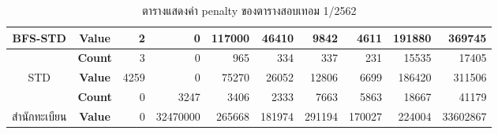 \begin{table}[]
{\begin{tabular}{@{}ccrrrrrrrr@{}}
    \multirow{-2}{*}{BFS-STD}                    & \textbf{Value}                        & 2                           & 0                        & 117000                       & 46410                        & 9842                         & 4611                        & 191880                        & 369745                        \\ \midrule
    {\color[HTML]{FE0000} }                      & {\color[HTML]{FE0000} \textbf{Count}} & {\color[HTML]{FE0000} 3}    & {\color[HTML]{FE0000} 0} & {\color[HTML]{FE0000} 965}   & {\color[HTML]{FE0000} 334}   & {\color[HTML]{FE0000} 337}   & {\color[HTML]{FE0000} 231}  & {\color[HTML]{FE0000} 15535}  & {\color[HTML]{FE0000} 17405}  \\ \cmidrule(l){2-10} 
    \multirow{-2}{*}{{\color[HTML]{FE0000} STD}} & {\color[HTML]{FE0000} \textbf{Value}} & {\color[HTML]{FE0000} 4259} & {\color[HTML]{FE0000} 0} & {\color[HTML]{FE0000} 75270} & {\color[HTML]{FE0000} 26052} & {\color[HTML]{FE0000} 12806} & {\color[HTML]{FE0000} 6699} & {\color[HTML]{FE0000} 186420} & {\color[HTML]{FE0000} 311506} \\ \midrule
                                                 & \textbf{Count}                        & 0                           & 3247                     & 3406                         & 2333                         & 7663                         & 5863                        & 18667                         & 41179                         \\ \cmidrule(l){2-10} 
    \multirow{-2}{*}{สำนักทะเบียน}                  & \textbf{Value}                        & 0                           & 32470000                 & 265668                       & 181974                       & 291194                       & 170027                      & 224004                        & 33602867                      \\ \bottomrule
    \end{tabular}%
    }
    \caption{ตารางแสดงค่า penalty ของตารางสอบเทอม 1/2562}
    \label{tab:result_table_162}
\end{table}
